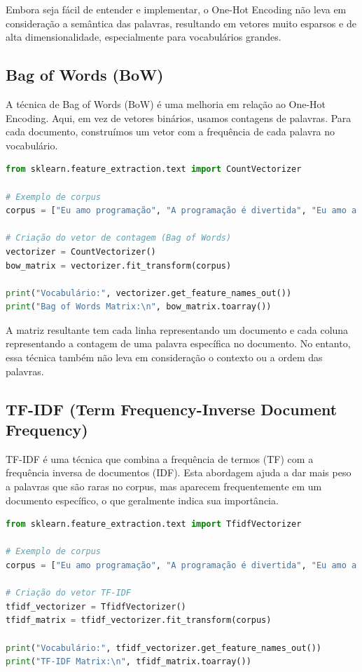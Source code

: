 \documentclass[14pt,a4paper,oneside]{book}
\begin{document}
Embora seja fácil de entender e implementar, o One-Hot Encoding não leva em consideração a semântica das palavras, resultando em vetores muito esparsos e de alta dimensionalidade, especialmente para vocabulários grandes.

\subsection{Bag of Words (BoW)}
A técnica de Bag of Words (BoW) é uma melhoria em relação ao One-Hot Encoding. Aqui, em vez de vetores binários, usamos contagens de palavras. Para cada documento, construímos um vetor com a frequência de cada palavra no vocabulário.

\begin{lstlisting}[language=Python]
from sklearn.feature_extraction.text import CountVectorizer

# Exemplo de corpus
corpus = ["Eu amo programação", "A programação é divertida", "Eu amo a vida"]

# Criação do vetor de contagem (Bag of Words)
vectorizer = CountVectorizer()
bow_matrix = vectorizer.fit_transform(corpus)

print("Vocabulário:", vectorizer.get_feature_names_out())
print("Bag of Words Matrix:\n", bow_matrix.toarray())
\end{lstlisting}

A matriz resultante tem cada linha representando um documento e cada coluna representando a contagem de uma palavra específica no documento. No entanto, essa técnica também não leva em consideração o contexto ou a ordem das palavras.

\subsection{TF-IDF (Term Frequency-Inverse Document Frequency)}
TF-IDF é uma técnica que combina a frequência de termos (TF) com a frequência inversa de documentos (IDF). Esta abordagem ajuda a dar mais peso a palavras que são raras no corpus, mas aparecem frequentemente em um documento específico, o que geralmente indica sua importância.

\begin{lstlisting}[language=Python]
from sklearn.feature_extraction.text import TfidfVectorizer

# Exemplo de corpus
corpus = ["Eu amo programação", "A programação é divertida", "Eu amo a vida"]

# Criação do vetor TF-IDF
tfidf_vectorizer = TfidfVectorizer()
tfidf_matrix = tfidf_vectorizer.fit_transform(corpus)

print("Vocabulário:", tfidf_vectorizer.get_feature_names_out())
print("TF-IDF Matrix:\n", tfidf_matrix.toarray())
\end{lstlisting}
\end{document}
